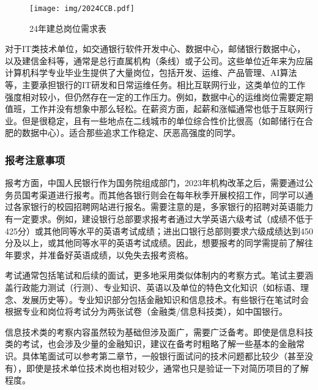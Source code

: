 \begin{figure}[htbp]
    \centering
    \texttt{[image: img/2024CCB.pdf]}
    \caption{24年建总岗位需求表}
    \label{岗位表}
\end{figure}



对于IT类技术单位，如交通银行软件开发中心、数据中心，邮储银行数据中心，以及建信金科等，通常是总行直属机构（条线）或子公司。这些单位近年来为应届计算机科学专业毕业生提供了大量岗位，包括开发、运维、产品管理、AI算法等，主要承担银行的IT研发和日常运维任务。相比互联网行业，这类单位的工作强度相对较小，但仍然存在一定的工作压力。例如，数据中心的运维岗位需要定期值班，工作并没有想象中那么轻松。在薪资方面，起薪和涨幅通常也低于互联网行业。但是很稳定，且有一些地点在二线城市的单位综合性价比很高（如邮储行在合肥的数据中心）。适合那些追求工作稳定、厌恶高强度的同学。



\subsubsection{报考注意事项}


报考方面，中国人民银行作为国务院组成部门，2023年机构改革之后，需要通过公务员国考渠道进行报考。而其他各银行则会在每年秋季开展校招工作，同学可以通过各家银行的校园招聘网站进行报名。需要注意的是，多家银行的招聘对英语能力有一定要求。例如，建设银行总部要求报考者通过大学英语六级考试（成绩不低于425分）或其他同等水平的英语考试成绩；进出口银行总部则要求六级成绩达到450分及以上，或其他同等水平的英语考试成绩。因此，想要报考的同学需提前了解往年要求，并准备好英语成绩，以免失去报考资格。


考试通常包括笔试和后续的面试，更多地采用类似体制内的考察方式。笔试主要涵盖行政能力测试（行测）、专业知识、英语以及单位的特色文化知识（如标语、理念、发展历史等）。专业知识部分包括金融知识和信息技术。有些银行在笔试时会根据专业和岗位将考试分为两张试卷（金融类/信息科技类），如中国银行。

信息技术类的考察内容虽然较为基础但涉及面广，需要广泛备考。即使是信息科技类的考试，也会涉及少量的金融知识，建议在备考时粗略了解一些基本的金融常识。具体笔面试可以参考第二章节，一般银行面试问的技术问题都比较少（甚至没有），即使是技术单位技术岗也相对较少，通常也只是验证一下对简历项目的了解程度。 